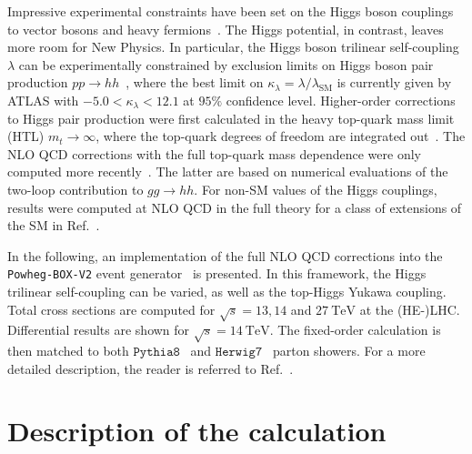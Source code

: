 \documentclass[a4paper]{jpconf}
\newcommand{\TeV}{\ensuremath{\mathrm{\:TeV}}}
\newcommand{\pythia}{\texttt{Pythia8}}
\newcommand{\herwig}{\texttt{Herwig7}}
\begin{document}
Impressive experimental constraints have been set on the Higgs boson couplings to vector bosons and heavy fermions~\cite{Khachatryan:2016vau,Aaboud:2017vzb,Sirunyan:2018koj,Sirunyan:2018sgc}. The Higgs potential, in contrast, leaves more room for New Physics. In particular, the Higgs boson trilinear self-coupling $\lambda$ can be experimentally constrained by exclusion limits on Higgs boson pair production $pp \to hh$~\cite{Sirunyan:2018two,ATLAS-CONF-2018-043}, where the best limit on $\kappa_{\lambda}=\lambda / \lambda_{\mathrm{SM}}$ is currently given by ATLAS with $-5.0 < \kappa_{\lambda} < 12.1$ at $95\%$ confidence level.
Higher-order corrections to Higgs pair production were first calculated in the heavy top-quark mass limit (HTL) $m_t \to \infty$, where the top-quark degrees of freedom are integrated out~\cite{Dawson:1998py,deFlorian:2013jea,Grigo:2014jma,deFlorian:2016uhr}. The NLO QCD corrections with the full top-quark mass dependence were only computed more recently~\cite{Borowka:2016ehy,Borowka:2016ypz,Baglio:2018lrj}. The latter are based on numerical evaluations of the two-loop contribution to $gg \to hh$. For non-SM values of the Higgs couplings, results were computed at NLO QCD in the full theory for a class of extensions of the SM in Ref.~\cite{Buchalla:2018yce}.

In the following, an implementation of the full NLO QCD corrections into the \texttt{Powheg-BOX-V2} event generator~\cite{Nason:2004rx,Frixione:2007vw,Alioli:2010xd} is presented. In this framework, the Higgs trilinear self-coupling can be varied, as well as the top-Higgs Yukawa coupling. Total cross sections are computed for $\sqrt{s}=13,14$ and $27 \TeV$ at the (HE-)LHC. Differential results are shown for $\sqrt{s}=14 \TeV$. The fixed-order calculation is then matched to both $\pythia$~\cite{Sjostrand:2014zea} and $\herwig$~\cite{Bellm:2015jjp,Bellm:2017bvx} parton showers. For a more detailed description, the reader is referred to Ref.~\cite{Heinrich:2019bkc}.

\section{Description of the calculation}
\end{document}
